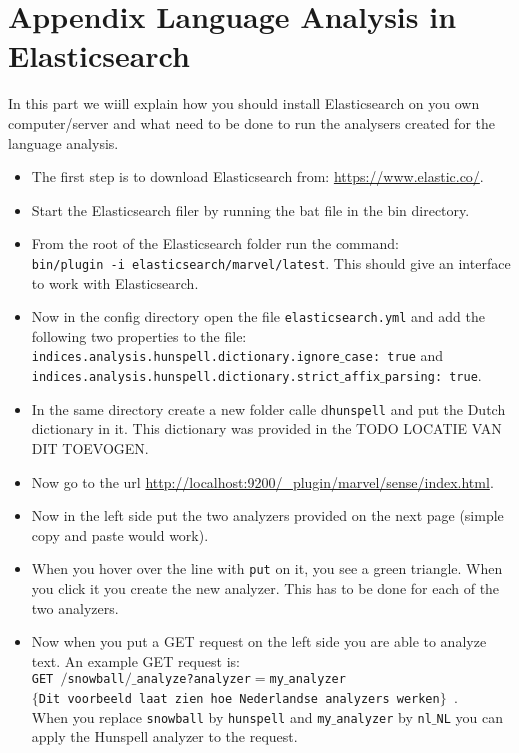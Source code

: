 \section{Appendix Language Analysis in Elasticsearch} \label{app:irjasper}
In this part we wiill explain how you should install Elasticsearch on you own computer/server and what need to be done to run the analysers created for the language analysis.
\begin{itemize}
  \item The first step is to download Elasticsearch from: \url{ https://www.elastic.co/}.
  \item Start the Elasticsearch filer by running the bat file in the bin directory.
  \item From the root of the Elasticsearch folder run the command: \\
	 \texttt{bin/plugin -i elasticsearch/marvel/latest}. This should give an interface to work with Elasticsearch.
  \item Now in the config directory open the file \texttt{elasticsearch.yml} and add the following two properties to the file: 
	\texttt{indices.analysis.hunspell.dictionary.ignore$\_$case: true} and \texttt{indices.analysis.hunspell.dictionary.strict$\_$affix$\_$parsing: true}. 
 \item In the same directory create a new folder calle d\texttt{hunspell} and put the Dutch dictionary in it. This dictionary was provided in the TODO LOCATIE VAN DIT TOEVOGEN.
 \item Now go to the url \url{http://localhost:9200/_plugin/marvel/sense/index.html}.
 \item Now in the left side put the two analyzers provided on the next page (simple copy and paste would work).
 \item When you hover over the line with \texttt{put} on it, you see a green triangle. When you click it you create the new analyzer. This has to be done for each of the two analyzers.
 \item Now when  you put a GET request on the left side you are able to analyze text. An example GET request is:\\
	\texttt{GET $/$snowball$/$$\_$analyze?analyzer$=$my$\_$analyzer }\\
  	\texttt{$\{$Dit voorbeeld laat zien hoe Nederlandse analyzers werken$\}$ }.\\
	When you replace \texttt{snowball} by \texttt{hunspell} and \texttt{my$\_$analyzer} by \texttt{nl$\_$NL} you can apply the Hunspell analyzer to the request. 
\end{itemize}
\newpage

